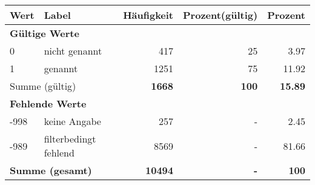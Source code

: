      \begin{longtable}{lXrrr}
     \toprule
     \textbf{Wert} & \textbf{Label} & \textbf{Häufigkeit} & \textbf{Prozent(gültig)} & \textbf{Prozent} \\
     \endhead
     \midrule
     \multicolumn{5}{l}{\textbf{Gültige Werte}}\\

     0 &
     \multicolumn{1}{X}{ nicht genannt   } &


       \num{417} &
       \num[round-mode=places,round-precision=2]{25} &
         \num[round-mode=places,round-precision=2]{3,97} \\

     1 &
     \multicolumn{1}{X}{ genannt   } &


       \num{1251} &
       \num[round-mode=places,round-precision=2]{75} &
         \num[round-mode=places,round-precision=2]{11,92} \\
     \midrule
     \multicolumn{2}{l}{Summe (gültig)} &
       \textbf{\num{1668}} &
     \textbf{100} &
       \textbf{\num[round-mode=places,round-precision=2]{15,89}} \\
     \multicolumn{5}{l}{\textbf{Fehlende Werte}}\\
       -998 &
       keine Angabe &
         \num{257} &
        - &
         \num[round-mode=places,round-precision=2]{2,45} \\
       -989 &
       filterbedingt fehlend &
         \num{8569} &
        - &
         \num[round-mode=places,round-precision=2]{81,66} \\
     \midrule
     \multicolumn{2}{l}{\textbf{Summe (gesamt)}} &
          \textbf{\num{10494}} &
        \textbf{-} &
        \textbf{100} \\
     \bottomrule
     \end{longtable}
     
